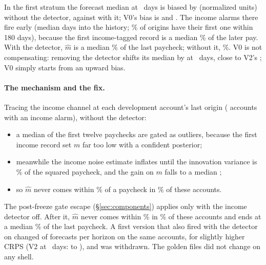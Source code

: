 In the first stratum the forecast median at \hC\ days is biased by
 (normalized units) without the
detector, against  with it; V0's bias is
 and .
The income alarms there fire early (median 
days into the history; \% of
origins have their first one within 180 days), because the first
income-tagged record is a median \% of
the later pay. With the detector, $\hat m$ is a median
\% of the last paycheck; without it,
\%. V0 is not compensating: removing the detector shifts its median by
 at \hC\ days, close to V2's
; V0 simply starts from an upward bias.

\paragraph{The mechanism and the fix.} Tracing the income channel at each
development account's last origin (
accounts with an income alarm), without the detector:
\begin{itemize}
\item a median 
  of the first twelve paychecks are gated as outliers, because the first
  income record set $m$ far too low with a confident posterior;
\item meanwhile the income noise estimate inflates until the innovation
  variance is \%
  of the squared paycheck, and the gain on $m$ falls to a median
  ;
\item so $\hat m$ never comes within \% of a paycheck in
  \% of these
  accounts.
\end{itemize}
The post-freeze gate escape (\S\ref{sec:components}) applies only with the
income detector off. After it, $\hat m$ never comes within \% in
\% of these
accounts and ends at a median \%
of the last paycheck. A first version that also fired with the detector on
changed  of
 forecasts per horizon on the same accounts,
for slightly higher CRPS (V2 at \hC\ days: 
to ), and was withdrawn. The
golden files did not change on any shell.

